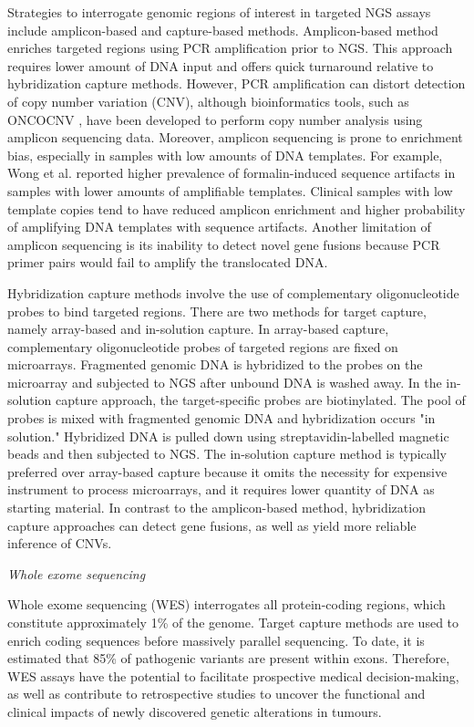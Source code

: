 Strategies to interrogate genomic regions of interest in targeted NGS assays include amplicon-based and capture-based methods. Amplicon-based method enriches targeted regions using PCR amplification prior to NGS. This approach requires lower amount of DNA input and offers quick turnaround relative to hybridization capture methods. However, PCR amplification can distort detection of copy number variation (CNV), although bioinformatics tools, such as ONCOCNV \cite{Boeva2014}, have been developed to perform copy number analysis using amplicon sequencing data. Moreover, amplicon sequencing is prone to enrichment bias, especially in samples with low amounts of DNA templates. For example, Wong et al. \cite{Wong2014} reported higher prevalence of formalin-induced sequence artifacts in samples with lower amounts of amplifiable templates. Clinical samples with low template copies tend to have reduced amplicon enrichment and higher probability of amplifying DNA templates with sequence artifacts. Another limitation of amplicon sequencing is its inability to detect novel gene fusions because PCR primer pairs would fail to amplify the translocated DNA.

Hybridization capture methods involve the use of complementary oligonucleotide probes to bind targeted regions. There are two methods for target capture, namely array-based and in-solution capture. In array-based capture, complementary oligonucleotide probes of targeted regions are fixed on microarrays. Fragmented genomic DNA is hybridized to the probes on the microarray and subjected to NGS after unbound DNA is washed away. In the in-solution capture approach, the target-specific probes are biotinylated. The pool of probes is mixed with fragmented genomic DNA and hybridization occurs "in solution." Hybridized DNA is pulled down using streptavidin-labelled magnetic beads and then subjected to NGS. The in-solution capture method is typically preferred over array-based capture because it omits the necessity for expensive instrument to process microarrays, and it requires lower quantity of DNA as starting material. In contrast to the amplicon-based method, hybridization capture approaches can detect gene fusions, as well as yield more reliable inference of CNVs.

\vspace{5mm}
\noindent\textit{Whole exome sequencing}

Whole exome sequencing (WES) interrogates all protein-coding regions, which constitute approximately 1\% of the genome. Target capture methods are used to enrich coding sequences before massively parallel sequencing. To date, it is estimated that 85\% of pathogenic variants are present within exons. Therefore, WES assays have the potential to facilitate prospective medical decision-making, as well as contribute to retrospective studies to uncover the functional and clinical impacts of newly discovered genetic alterations in tumours.

